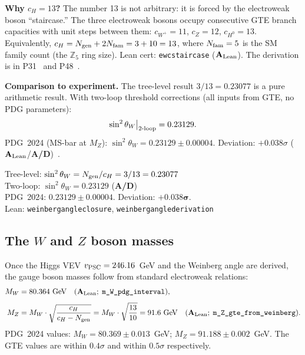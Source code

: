 \documentclass[11pt,a4paper]{article}
\newcommand{\lean}[1]{%
  \penalty-100
  \begingroup\def\_{\textunderscore\allowbreak}\texttt{#1}\endgroup}
\newcommand{\CatAL}{\ensuremath{\mathbf{A}_{\rm Lean}}}
\newcommand{\CatAD}{\textbf{A/D}}
\newcommand{\Ngen}{N_{\rm gen}}
\newcommand{\cH}{c_H}
\begin{document}
\textbf{Why $c_H = 13$?}
The number 13 is not arbitrary: it is forced by the electroweak boson
``staircase.'' The three electroweak bosons occupy consecutive GTE branch
capacities with unit steps between them: $c_{W^+} = 11$, $c_Z = 12$,
$c_{H^0} = 13$. Equivalently, $c_H = \Ngen + 2N_{\rm fam} = 3 + 10 = 13$,
where $N_{\rm fam} = 5$ is the SM family count (the $\mathbb{Z}_5$ ring size).
Lean cert: \lean{ew\_c\_staircase} (\CatAL).
The derivation is in P31~\cite{SpivackWeinbergAngle} and P48~\cite{SpivackGTECompleteFramework}.

\textbf{Comparison to experiment.}
The tree-level result $3/13 = 0.23077$ is a pure arithmetic result.
With two-loop threshold corrections (all inputs from GTE, no PDG parameters):
\[
  \sin^2\theta_W\big|_{\rm 2\text{-}loop} = 0.23129.
\]
PDG~2024 (MS-bar at $M_Z$): $\sin^2\theta_W = 0.23129 \pm 0.00004$.
Deviation: $+0.038\sigma$ (\CatAL/\CatAD)~\cite{SpivackGTECompleteFramework}.

\begin{tcolorbox}[colback=boxorange,colframe=orange!60!black,
  title={Result: Weinberg Angle (\CatAL)}]
Tree-level: $\sin^2\theta_W = \Ngen/\cH = 3/13 = 0.23077$\\[2pt]
Two-loop: $\sin^2\theta_W = 0.23129$ (\CatAD)\\[2pt]
PDG~2024: $0.23129 \pm 0.00004$. Deviation: $\mathbf{+0.038\sigma}$.\\[2pt]
Lean: \lean{weinberg\_angle\_closure}, \lean{weinberg\_angle\_derivation}
\end{tcolorbox}

\subsection{The $W$ and $Z$ boson masses}

Once the Higgs VEV $v_{\rm PSC} = 246.16$~GeV and the Weinberg angle are
derived, the gauge boson masses follow from standard electroweak relations:
\begin{align}
  M_W &= 80.364~\text{GeV} \quad (\CatAL;\;\lean{m\_W\_pdg\_interval}),
  \label{eq:mw}\\[4pt]
  M_Z &= M_W \cdot \sqrt{\frac{\cH}{\cH - \Ngen}}
       = M_W \cdot \sqrt{\frac{13}{10}}
       = 91.6~\text{GeV} \quad (\CatAL;\;\lean{m\_Z\_gte\_from\_weinberg}).
  \label{eq:mz}
\end{align}
PDG~2024 values: $M_W = 80.369 \pm 0.013$~GeV; $M_Z = 91.188 \pm 0.002$~GeV.
The GTE values are within $0.4\sigma$ and within $0.5\sigma$ respectively.
\end{document}
